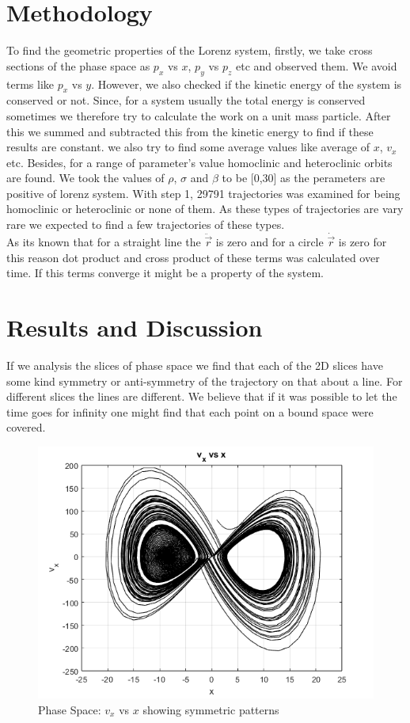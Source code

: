 \documentclass[%
reprint,
amsmath,amssymb,
aps,
floatfix,
]{revtex4-2}
\begin{document}
	\section{Methodology}
	To find the geometric properties of the Lorenz system, firstly, we take cross sections of the phase space as $p_x$ vs $x$, $p_y$ vs $p_z$ etc and observed them. We avoid terms like $p_x$ vs $y$. However, we also checked if the kinetic energy of the system is conserved or not. Since, for a system usually the total energy is conserved sometimes we therefore try to calculate the work on a unit mass particle. After this we summed and subtracted this from the kinetic energy to find if these results are constant. 
	we also try to find some average values like average of $x$, $v_x$ etc. Besides, for a range of parameter's value homoclinic and heteroclinic orbits are found. We took the values of $\rho$, $\sigma$ and $\beta$ to be [0,30] as the perameters are positive of lorenz system. With step 1, 29791 trajectories was examined for being homoclinic or heteroclinic or none of them. As these types of trajectories are vary rare we expected to find a few trajectories of these types.    \\
	As its known that for a straight line the $\ddot{\vec{r}}$ is zero and for a circle $\dot{\vec{r}}$ is zero for this reason dot product and cross product of these terms was calculated over time. If this terms converge it might be a property of the system.
	
	\section{Results and Discussion}
	If we analysis the slices of phase space we find that each of the 2D slices have some kind symmetry or anti-symmetry of the trajectory on that about a line. For different slices the lines are different. We believe that if it was possible to let the time goes for infinity one might find that each point on a bound space were covered. 
	\begin{figure}[htbp]
		\centering
		\includegraphics[width=0.8\linewidth]{v_x_vs_x.png}
		\caption{Phase Space: $v_x$ vs $x$ showing symmetric patterns}
		\label{fig:vx_x}
	\end{figure}
	
\end{document}
